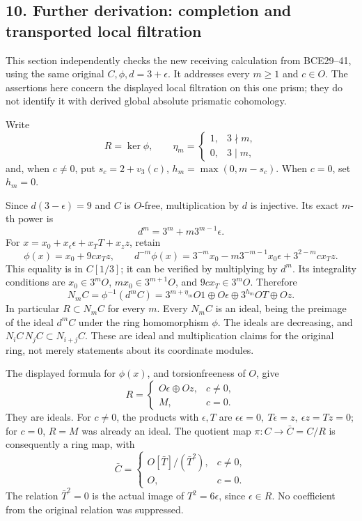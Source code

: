 \documentclass[
  10pt,
]{article}
\begin{document}
\subsection{10. Further derivation: completion and transported local
filtration}\label{further-derivation-completion-and-transported-local-filtration}

This section independently checks the new receiving calculation from
BCE29--41, using the same original \(C,\phi,d=3+\epsilon\). It addresses
every \(m\ge1\) and \(c\in O\). The assertions here concern the
displayed local filtration on this one prism; they do not identify it
with derived global absolute prismatic cohomology.

Write \[
R=\ker\phi,\qquad
\eta_m=\begin{cases}1,&3\nmid m,\\0,&3\mid m,\end{cases}
\] and, when \(c\ne0\), put \(s_c=2+v_3(c)\), \(h_m=\max(0,m-s_c)\).
When \(c=0\), set \(h_m=0\).

Since \(d(3-\epsilon)=9\) and \(C\) is \(O\)-free, multiplication by
\(d\) is injective. Its exact \(m\)-th power is \[
d^m=3^m+m3^{m-1}\epsilon.
\] For \(x=x_0+x_\epsilon\epsilon+x_TT+x_zz\), retain \[
\phi(x)=x_0+9cx_Tz,\qquad
d^{-m}\phi(x)=
3^{-m}x_0-m3^{-m-1}x_0\epsilon+3^{2-m}cx_Tz. \tag{I24}
\] This equality is in \(C[1/3]\); it can be verified by multiplying by
\(d^m\). Its integrality conditions are \(x_0\in3^mO\),
\(mx_0\in3^{m+1}O\), and \(9cx_T\in3^mO\). Therefore \[
N_mC=\phi^{-1}(d^mC)
=3^{m+\eta_m}O1\oplus O\epsilon
 \oplus3^{h_m}OT\oplus Oz. \tag{I25}
\] In particular \(R\subset N_mC\) for every \(m\). Every \(N_mC\) is an
ideal, being the preimage of the ideal \(d^mC\) under the ring
homomorphism \(\phi\). The ideals are decreasing, and
\(N_iC\,N_jC\subset N_{i+j}C\). These are ideal and multiplication
claims for the original ring, not merely statements about its coordinate
modules.

The displayed formula for \(\phi(x)\), and torsionfreeness of \(O\),
give \[
R=
\begin{cases}
O\epsilon\oplus Oz,&c\ne0,\\
M,&c=0.
\end{cases} \tag{I26}
\] They are ideals. For \(c\ne0\), the products with \(\epsilon,T\) are
\(\epsilon\epsilon=0,\ T\epsilon=z,\ \epsilon z=Tz=0\); for \(c=0\),
\(R=M\) was already an ideal. The quotient map \(\pi:C\to\bar C=C/R\) is
consequently a ring map, with \[
\bar C=
\begin{cases}
O[\bar T]/(\bar T^2),&c\ne0,\\
O,&c=0.
\end{cases} \tag{I27}
\] The relation \(\bar T^2=0\) is the actual image of \(T^2=6\epsilon\),
since \(\epsilon\in R\). No coefficient from the original relation was
suppressed.
\end{document}
